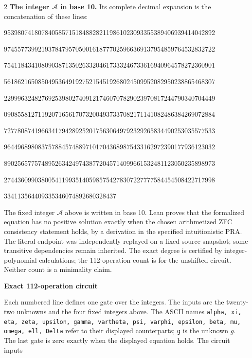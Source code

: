 \documentclass[10pt]{article}
\begin{document}
\begin{multicols}{2}
\textbf{The integer $\mathcal A$ in base 10.}
Its complete decimal expansion is the concatenation of these lines:\par
\begingroup\fontsize{7.7}{8.2}\selectfont{}\par
95398074180784058571518488282119861023093355389406939414042892\par
97455773992193784795705001618777025966369137954859764532832722\par
75411843410809038713502633204617333246733616940964578272360901\par
56186216508504953649192752154519268024509952082950238865468307\par
22999632482769253980274091217460707829023970817244790340704449\par
09085581271192071656170732004937337082171141082486384269072884\par
72778087419663417942892520175630649792329265834490253035577533\par
96449689808375788457488971017043689875433162972390177936123032\par
89025657757489526342497438772045714099661532481123050235898973\par
27443609903800541199351405985754278307227777584454508422717998\par
334113564409335346074892680328437\par
\endgroup
\normalfont\fontsize{7.7}{8.2}\selectfont
The fixed integer $\mathcal A$ above is written in base 10. Lean proves that the formalized equation has no positive solution exactly
when the chosen arithmetized ZFC consistency statement holds, by a derivation
in the specified intuitionistic PRA. The literal endpoint was independently
replayed on a fixed source snapshot; some transitive dependencies remain
inherited. The exact degree is certified by integer-polynomial calculations;
the 112-operation count is for the unshifted circuit. Neither count is a
minimality claim.
\end{multicols}
\clearpage
\begin{center}{\large\bfseries Exact 112-operation circuit}\end{center}
Each numbered line defines one gate over the integers. The inputs are the
twenty-two unknowns and the four fixed integers above. The ASCII names
\texttt{alpha, xi, eta, zeta, upsilon, gamma, vartheta, psi, varphi, epsilon, beta, mu, omega, ell, Delta}
refer to their displayed counterparts; \texttt{g} is the unknown $g$. The last
gate is zero exactly when the displayed equation holds. The circuit inputs
\end{document}
